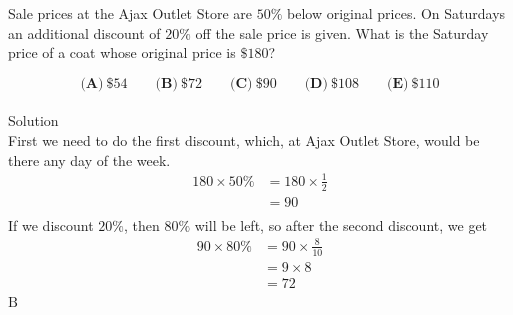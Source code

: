 

Sale prices at the Ajax Outlet Store are $ 50 \%$ below original prices. On Saturdays an additional discount of $ 20 \%$ off the sale price is given. What is the Saturday price of a coat whose original price is $ \$180$?

\[ \textbf{(A)}\ \$54 \qquad
\textbf{(B)}\ \$72 \qquad
\textbf{(C)}\ \$90 \qquad
\textbf{(D)}\ \$108 \qquad
\textbf{(E)}\ \$110
\]
\\
Solution
\\
First we need to do the first discount, which, at Ajax Outlet Store, would be there any day of the week. \begin{align*} 180 \times 50\% &= 180 \times \frac{1}{2} \\ &= 90 \\ \end{align*}
If we discount $20\%$, then $80 \%$ will be left, so after the second discount, we get \begin{align*} 90 \times 80\% &= 90 \times \frac{8}{10} \\ &= 9 \times 8 \\ &= 72 \\ \end{align*}
$\boxed{\text{B}}$